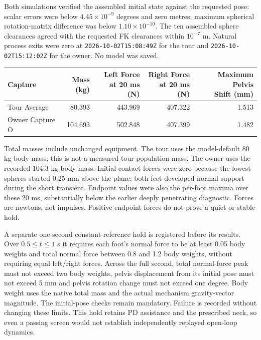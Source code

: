 \documentclass[11pt,a4paper]{article}
\begin{document}
Both simulations verified the assembled initial state against the requested
pose: scalar errors were below $4.45\times10^{-9}$ degrees and zero metres;
maximum spherical rotation-matrix difference was below
$1.10\times10^{-10}$. The ten assembled sphere clearances agreed with the
requested FK clearances within $10^{-7}$ m. Natural process exits were zero
at \texttt{2026-10-02T15:08:49Z} for the tour and
\texttt{2026-10-02T15:12:02Z} for the owner. No model was saved.
\begin{center}
\begin{tabular}{lrrrr}
\toprule
Capture & \shortstack{Mass\\(kg)} & \shortstack{Left Force\\at 20 ms (N)} & \shortstack{Right Force\\at 20 ms (N)} & \shortstack{Maximum Pelvis\\Shift (mm)} \\
\midrule
Tour Average & 80.393 & 443.969 & 407.322 & 1.513 \\
Owner Capture O & 104.693 & 502.848 & 407.399 & 1.482 \\
\bottomrule
\end{tabular}
\end{center}
Total masses include unchanged equipment. The tour uses the model-default
80 kg body mass; this is not a measured tour-population mass. The owner uses
the recorded 104.3 kg body mass. Initial contact forces were zero because
the lowest spheres started 0.25 mm above the plane; both feet developed
normal support during the short transient. Endpoint values were also the
per-foot maxima over these 20 ms, substantially below the earlier deeply
penetrating diagnostic. Forces are newtons, not impulses. Positive endpoint
forces do not prove a quiet or stable hold.

A separate one-second constant-reference hold is registered before its
results. Over $0.5\le t\le1$ s it requires each foot's normal force to be
at least 0.05 body weights and total normal force between 0.8 and 1.2 body
weights, without requiring equal left/right forces. Across the full second,
total normal-force peak must not exceed two body weights, pelvis
displacement from its initial pose must not exceed 5 mm and pelvis rotation
change must not exceed one degree. Body weight uses the native total mass
and the actual mechanism gravity-vector magnitude. The initial-pose checks
remain mandatory. Failure is recorded without changing these limits.
This hold retains PD assistance and the prescribed neck, so even a passing
screen would not establish independently replayed open-loop dynamics.
\end{document}
